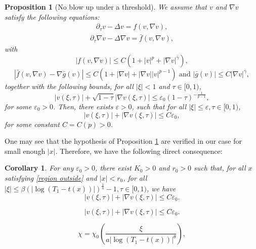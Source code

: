 \documentclass[10pt,a4paper]{amsart}
\newtheorem{prp}{Proposition}
\newtheorem{cor}{Corollary}
\begin{document}
\begin{prp}[No blow up under a threshold]\label{prp bound v}
We assume that $v$ and $\nabla v$ satisfy the following equations:
\begin{equation}\label{ineq v}
\begin{split}
\partial_\tau v -\Delta v=f(v,\nabla v),
\end{split}
\end{equation}
\begin{equation}\label{ineq grad v}
\begin{split}
\partial_\tau \nabla v -\Delta \nabla v=\bar f(v,\nabla v),
\end{split}
\end{equation}
with $$|f(v,\nabla v)|\leq C(1+|v|^p+|\nabla v|^{\bar{\gamma}}),$$
$$|\bar f(v,\nabla v)-\nabla \bar g(v)|\leq C(1+|\nabla v|+|\nabla v||v|^{p-1}) \text{ and }|\bar g(v)|\leq C|\nabla v|^{\bar{\gamma}},$$
together with the following bounds, for all $ |\xi|<1$ and $\tau\in [0,1)$,
\begin{equation*}\label{bound v & nabla v}
|v(\xi,\tau)|+\sqrt{1-\tau}|\nabla v(\xi,\tau)|\leq \varepsilon_0(1-\tau)^{-\frac{1}{p-1}},
\end{equation*}
for some $\varepsilon_0>0$. Then, there exists $\varepsilon>0$, such that for all $|\xi|\leq \varepsilon,\tau \in [0,1)$,
$$|v(\xi,\tau)|+|\nabla v(\xi,\tau)|\leq C\varepsilon_0,$$
for some constant $C=C(p)>0$.
\end{prp}
One may see that the hypothesis of Proposition \ref{prp bound v} are verified in our case for small enough $|x|$. Therefore, we have the following direct consequence:
\begin{cor}\label{cor bound v, nabla v}
For any $\varepsilon_0 > 0$, there exist $K_0 > 0$ and $r_0 > 0$ such that, for all $x$ satisfying \eqref{region outside} and $|x| < r_0$, for all $|\xi|\leq\beta (|\log(T_1-t(x))|)^{\frac{1}{4}}-1,\tau \in [0,1)$, we have
\begin{equation}\label{bound v}
|v(\xi,\tau)|+|\nabla v(\xi,\tau)|\leq C\varepsilon_0.
\end{equation}
\end{cor}

\begin{equation}
|v(\xi,\tau)|+|\nabla v(\xi,\tau)|\leq C\varepsilon_0.
\end{equation}

\begin{equation}\label{chi a}
\chi=\chi_0\left(\frac{\xi}{a|\log(T_1-t(x))|^{\theta}}\right),
\end{equation}
\end{document}
